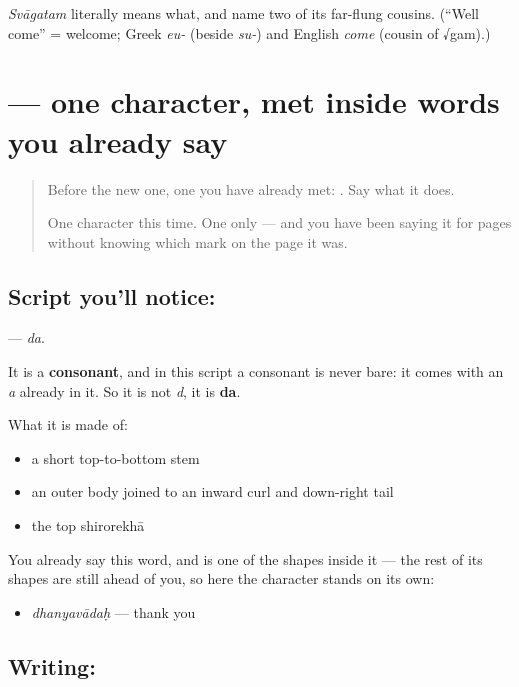 \begin{tcolorbox}[breakable,colback=teal!4,colframe=teal!35!black,title={Before you move on}]
\emph{Svāgatam} literally means what, and name two of its far-flung cousins. (\textquotedblleft{}Well come\textquotedblright{} = welcome; Greek \emph{eu-} (beside \emph{su-}) and English \emph{come} (cousin of √gam).)
\end{tcolorbox}
\section[\texorpdfstring{\sk{द} (da)}{द (da)}]{ — one character, met inside words you already say}

\label{lesson:SA-S200-letter-da}



\begin{quote}
Before the new one, one you have already met: . Say what it does.

One character this time. One only — and you have been saying it for pages without knowing which mark on the page it was.
\end{quote}

\subsection*{Script you'll notice: }
\textbf{} — \emph{da}.

It is a \textbf{consonant}, and in this script a consonant is never bare: it comes with an \emph{a} already in it. So it is not \emph{d}, it is \textbf{da}.

What it is made of:

\begin{itemize}
\raggedright
  \item a short top-to-bottom stem
  \item an outer body joined to an inward curl and down-right tail
  \item the top shirorekhā
\end{itemize}

You already say this word, and  is one of the shapes inside it — the rest of its shapes are still ahead of you, so here the character stands on its own:

\begin{itemize}
\raggedright
  \item \emph{dhanyavādaḥ} — thank you
\end{itemize}

\subsection*{Writing: }

